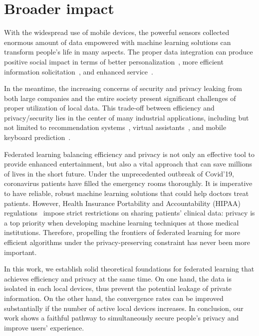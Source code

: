 
\section{Broader impact}
With the widespread use of mobile devices, the powerful sensors
collected enormous amount of data empowered with machine learning
solutions can transform people's life in many aspects. The proper
data integration can produce positive social
impact in terms of better personalization~\cite{fallah2020personalized}, more efficient information solicitation~\cite{chen2018federated}, and enhanced service~\cite{47586}.

In the meantime, the increasing concerns of security and
privacy leaking from both large companies and the entire society
present significant challenges of proper utilization of local
data. This trade-off between efficiency and privacy/security
lies in the center of many industrial applications, including 
but not limited to recommendation systems~\cite{chen2018federated}, virtual assistants~\cite{lamautonomy}, and mobile keyboard prediction~\cite{47586}.

Federated learning balancing efficiency and privacy is not only an effective
tool to provide enhanced entertainment, but also a vital approach that can
save millions of lives in the short future.  Under the unprecedented outbreak
of Covid'19, coronavirus patients have filled the emergency rooms
thoroughly. It is imperative to have reliable, robust machine learning
solutions that could help doctors treat patients. However,  Health Insurance Portability and Accountability (HIPAA) regulations~\cite{assistance2003summary}
impose strict restrictions on sharing patients' clinical data: privacy is a
top priority when developing machine learning techniques at those medical institutions. 
Therefore, propelling the frontiers of federated learning for more efficient 
algorithms under the privacy-preserving constraint has never been more
important.

In this work, we establish solid theoretical foundations for federated
learning that achieves efficiency and privacy at the same time. 
On one hand, the data is isolated in each local devices, thus prevent
the potential leakage of private information. On the other hand, the
convergence rates can be improved substantially if the number of
active local devices increases. In conclusion, our work 
shows a faithful pathway to simultaneously secure people's privacy and improve
users' experience.



